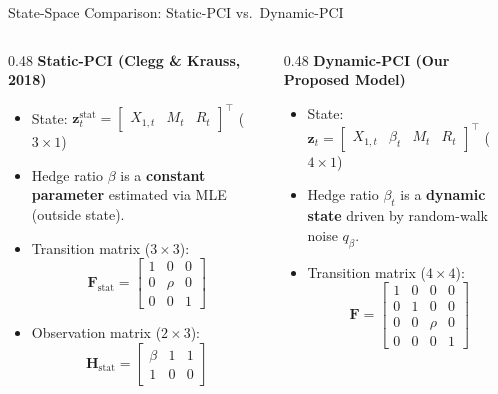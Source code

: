 \documentclass[10pt, aspectratio=169]{beamer}
\begin{document}
\begin{frame}{State-Space Comparison: Static-PCI vs.\ Dynamic-PCI}
  \begin{columns}[T]
    \begin{column}{0.48\textwidth}
      \textbf{Static-PCI (Clegg \& Krauss, 2018)}
      \begin{itemize}
        \item State: $\bm{z}_t^{\text{stat}} = \begin{bmatrix}X_{1,t} & M_t & R_t\end{bmatrix}^\top$ ($3 \times 1$)
        \item Hedge ratio $\beta$ is a \textbf{constant parameter} estimated via MLE (outside state).
        \item Transition matrix ($3 \times 3$):
          \[
            \bm{F}_{\text{stat}} = \begin{bmatrix}1 & 0 & 0\\ 0 & \rho & 0\\ 0 & 0 & 1\end{bmatrix}
          \]
        \item Observation matrix ($2 \times 3$):
          \[
            \bm{H}_{\text{stat}} = \begin{bmatrix}\beta & 1 & 1\\ 1 & 0 & 0\end{bmatrix}
          \]
      \end{itemize}
    \end{column}
    \begin{column}{0.48\textwidth}
      \textbf{Dynamic-PCI (Our Proposed Model)}
      \begin{itemize}
        \item State: $\bm{z}_t = \begin{bmatrix}X_{1,t} & \beta_t & M_t & R_t\end{bmatrix}^\top$ (\textbf{$4 \times 1$})
        \item Hedge ratio $\beta_t$ is a \textbf{dynamic state} driven by random-walk noise $q_\beta$.
        \item Transition matrix (\textbf{$4 \times 4$}):
          \[
            \bm{F} = \begin{bmatrix}1 & 0 & 0 & 0\\ 0 & 1 & 0 & 0\\ 0 & 0 & \rho & 0\\ 0 & 0 & 0 & 1\end{bmatrix}
\]
\end{itemize}
\end{column}
\end{columns}
\end{frame}
\end{document}
